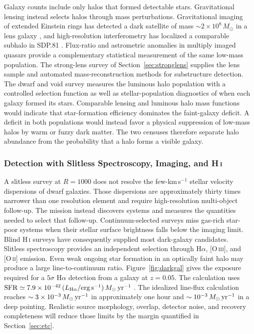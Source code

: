Galaxy counts include only halos that formed detectable stars. Gravitational lensing instead selects halos through mass perturbations. Gravitational imaging of extended Einstein rings has detected a dark satellite of mass $\sim2\times10^{8}\,M_\odot$ in a lens galaxy \cite{vegetti2012}, and high-resolution interferometry has localized a comparable subhalo in SDP.81 \cite{hezaveh2016}. Flux-ratio and astrometric anomalies in multiply imaged quasars provide a complementary statistical measurement of the same low-mass population. The strong-lens survey of Section~\ref{sec:stronglens} supplies the lens sample and automated mass-reconstruction methods for substructure detection. The dwarf and void survey measures the luminous halo population with a controlled selection function as well as stellar-population diagnostics of when each galaxy formed its stars. Comparable lensing and luminous halo mass functions would indicate that star-formation efficiency dominates the faint-galaxy deficit. A deficit in both populations would instead favor a physical suppression of low-mass halos by warm or fuzzy dark matter. The two censuses therefore separate halo abundance from the probability that a halo forms a visible galaxy.

\subsubsection{Detection with Slitless Spectroscopy, Imaging, and H\,\textsc{i}}

A slitless survey at $R=1000$ does not resolve the few-km\,s$^{-1}$ stellar velocity dispersions of dwarf galaxies. Those dispersions are approximately thirty times narrower than one resolution element and require high-resolution multi-object follow-up. The mission instead discovers systems and measures the quantities needed to select that follow-up. Continuum-selected surveys miss gas-rich star-poor systems when their stellar surface brightness falls below the imaging limit. Blind H\,\textsc{i} surveys have consequently supplied most dark-galaxy candidates. Slitless spectroscopy provides an independent selection through H$\alpha$, [O\,\textsc{iii}], and [O\,\textsc{ii}] emission. Even weak ongoing star formation in an optically faint halo may produce a large line-to-continuum ratio. Figure~\ref{fig:darkgal} gives the exposure required for a $5\sigma$ H$\alpha$ detection from a galaxy at $z=0.05$. The calculation uses ${\rm SFR}\simeq7.9\times10^{-42}\,(L_{\rm H\alpha}/{\rm erg\,s^{-1}})\,M_\odot\,{\rm yr^{-1}}$ \cite{kennicutt1998}. The idealized line-flux calculation reaches $\sim3\times10^{-3}\,M_\odot\,{\rm yr}^{-1}$ in approximately one hour and $\sim10^{-3}\,M_\odot\,{\rm yr}^{-1}$ in a deep pointing. Realistic source morphology, overlap, detector noise, and recovery completeness will reduce those limits by the margin quantified in Section~\ref{sec:etc}.


